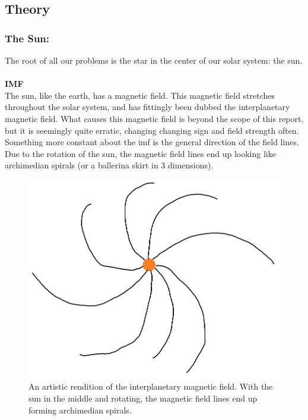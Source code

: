 \documentclass[norsk,a4paper,12pt]{article}
\begin{document}
\newpage
\subsection{Theory} %
\label{sub:theory}
	\subsubsection{The Sun:} 
		The root of all our problems is the star in the center of our solar system: the sun.\\
		\\
		\textbf{IMF}\\
		The sun, like the earth, has a magnetic field. This magnetic field stretches throughout the solar system, and has fittingly been dubbed the 						interplanetary magnetic field. What causes this magnetic field is beyond the scope of this report, but it is seemingly quite erratic, changing changing 				sign and field strength often.\\
		Something more constant about the imf is the general direction of the field lines. Due to the rotation of the sun, the magnetic field lines end up looking 			like archimedian spirals (or a ballerina skirt in 3 dimensions).
		\begin{figure}[H]
			\includegraphics[scale = 0.3]{Figures/artistic_imf.png}
			\centering
			\caption{An artistic rendition of the interplanetary magnetic field. With the sun in the middle and rotating, the magnetic field lines end up forming 					     archimedian spirals.}
			\label{fig::spirals}
		\end{figure}
\end{document}
